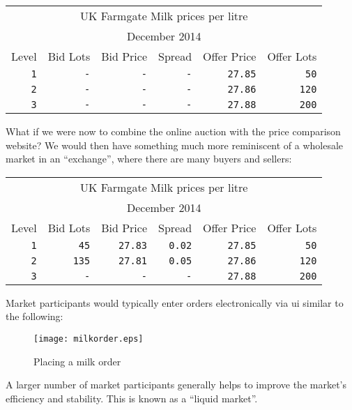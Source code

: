 \documentclass[11pt,a4paper]{article}
\begin{document}
\vspace{5mm}
\begin{tabular}{r|rrrrr}
\multicolumn{6}{c}{UK Farmgate Milk prices per litre}\\
\multicolumn{6}{c}{December 2014}\\
Level&Bid Lots&Bid Price&Spread&Offer Price&Offer Lots\\
\hline
\texttt{1}&\texttt{-}&\texttt{-}&\texttt{-}&\texttt{27.85}&\texttt{50}\\
\texttt{2}&\texttt{-}&\texttt{-}&\texttt{-}&\texttt{27.86}&\texttt{120}\\
\texttt{3}&\texttt{-}&\texttt{-}&\texttt{-}&\texttt{27.88}&\texttt{200}\\
\end{tabular}
\vspace{5mm}

What if we were now to combine the online \gls{auction} with the price comparison website? We would
then have something much more reminiscent of a wholesale \gls{market} in an ``\gls{exchange}'',
where there are many buyers and sellers:

\vspace{5mm}
\begin{tabular}{r|rrrrr}
\multicolumn{6}{c}{UK Farmgate Milk prices per litre}\\
\multicolumn{6}{c}{December 2014}\\
Level&Bid Lots&Bid Price&Spread&Offer Price&Offer Lots\\
\hline
\texttt{1}&\texttt{45}&\texttt{27.83}&\texttt{0.02}&\texttt{27.85}&\texttt{50}\\
\texttt{2}&\texttt{135}&\texttt{27.81}&\texttt{0.05}&\texttt{27.86}&\texttt{120}\\
\texttt{3}&\texttt{-}&\texttt{-}&\texttt{-}&\texttt{27.88}&\texttt{200}\\
\end{tabular}
\vspace{5mm}

Market participants would typically enter orders electronically via \gls{ui} similar to the
following:

\begin{figure}[H]
\centering
\texttt{[image: milkorder.eps]}
\caption{Placing a milk order}
\end{figure}

A larger number of \gls{market} participants generally helps to improve the \gls{market}'s
efficiency and stability. This is known as a ``\gls{liquid market}''.
\end{document}
